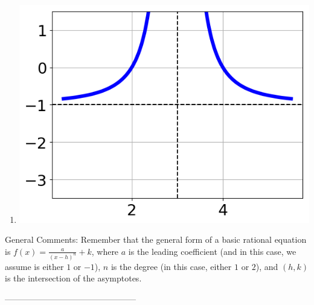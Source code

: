 \documentclass{article}[10pt]
\begin{document}
\begin{enumerate}[label=\Alph*.]
\item  
\begin{center}\includegraphics[scale=0.5]{../Figures/question35AA.png}\end{center} 
 
\end{enumerate} 
 
General Comments: Remember that the general form of a basic rational equation is $ f(x) = \frac{a}{(x-h)^n} + k$, where $a$ is the leading coefficient (and in this case, we assume is either $1$ or $-1$), $n$ is the degree (in this case, either $1$ or $2$), and $(h, k)$ is the intersection of the asymptotes.

-----------------------------------------------
\end{document}
